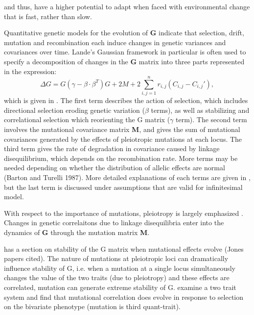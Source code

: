 \documentclass[9pt,twocolumn,twoside]{gsajnl}
\newcommand{\G}{\textbf{G }}
\begin{document}
and thus, have a higher potential to adapt when faced with environmental change that is fast, rather than slow. 

Quantitative genetic models for the evolution of \G indicate that selection, drift, mutation and recombination each induce changes in genetic variances and covariances over time. Lande's Gaussian framework in particular is often used to specify a decomposition of changes in the \G matrix into three parts represented in the expression:
\[\Delta G = G(\gamma - \beta \cdot \beta^T)G + 2 M + 2\sum_{i,j=1}^n r_{i,j}(C_{i,j}-C_{i,j}'),\]
which is given in \cite[Chapter 20, Box 3]{fox2006evolutionary}. The first term describes the action of selection, which includes directional selection eroding genetic variation ($\beta$ terms), as well as stabilizing and correlational selection which reorienting the G matrix ($\gamma$ term). The second term involves the mutational covariance matrix \textbf{M}, and gives the sum of mutational covariances generated by the effects of pleiotropic mutations at each locus. The third term gives the rate of degradation in covariance caused by linkage disequilibrium, which depends on the recombination rate. More terms may be needed depending on whether the distribution of allelic effects are normal (Barton and Turelli 1987). More detailed explanations of each terms are given in  \cite[Chp34,35,36]{lynch2018evolution}, but the last term is discussed under assumptions that are valid for infinitesimal model.

With respect to the importance of mutations, pleiotropy is largely emphasized \cite{reeve2000predicting,Steppan2002,Arnold2008}. Changes in genetic correlaitons due to linkage disequilibria enter into the dynamics of \G through the mutation matrix \textbf{M}. 
\cite{Phillips2001}
\cite{lande1979quantitative} 

\cite{Arnold2008} has a section on stability of the G matrix when mutational effects evolve (Jones papers cited). 
\cite{Jones2003} The nature of mutations at pleiotropic loci can dramatically influence stability of G, i.e. when a mutation at a single locus simultaneously changes the value of the two traits (due to pleiotropy) and these effects are correlated, mutation can generate extreme stability of G. 
\cite{Jones2007} examine a two trait system and find that mutational correlation does evolve in response to selection on the bivariate phenotype (mutation is third quant-trait).\par
\end{document}
